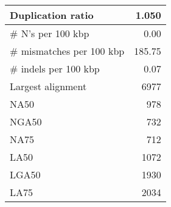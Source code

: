\documentclass[12pt,a4paper]{article}
\begin{document}
\begin{table}[ht]
\begin{center}
\begin{tabular}{|l*{1}{|r}|}
Duplication ratio & 1.050 \\ \hline
\# N's per 100 kbp & 0.00 \\ \hline
\# mismatches per 100 kbp & 185.75 \\ \hline
\# indels per 100 kbp & 0.07 \\ \hline
Largest alignment & 6977 \\ \hline
NA50 & 978 \\ \hline
NGA50 & 732 \\ \hline
NA75 & 712 \\ \hline
LA50 & 1072 \\ \hline
LGA50 & 1930 \\ \hline
LA75 & 2034 \\ \hline
\end{tabular}
\end{center}
\end{table}
\end{document}
